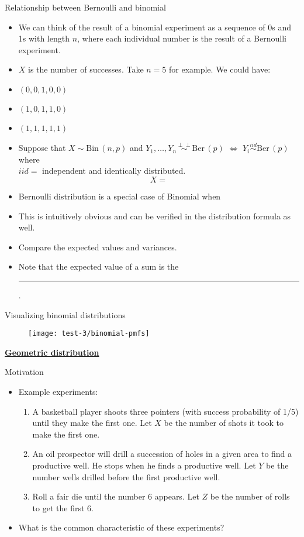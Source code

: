 \documentclass{article}
\newcommand{\bu}[1]{\textbf{\ul{#1}}}				%
\newcommand{\blankul}[1]{\rule[-1.5mm]{#1}{0.15mm}}	%
\newcommand{\vectwo}[2]{#1_1, \ldots, #1_{#2}}	%
\newcommand{\follow}[1]{\sim \text{#1}\,}		%
\newcommand{\followsp}[2]{\overset{#1}\sim \text{#2}\,}		%
\newcommand{\ind}{\perp \!\!\! \perp}		%
\begin{document}
Relationship between Bernoulli and binomial\bigskip
\begin{itemize}
    \item We can think of the result of a binomial experiment as a sequence of 0s and 1s with length $n$, where each individual number is the result of a Bernoulli experiment.
    \item $X$ is the number of successes. Take $n = 5$ for example. We could have:
    \item[] $(0,0,1,0,0)$
    \item[] $(1,0,1,1,0)$
    \item[] $(1,1,1,1,1)$\bigskip
    \item Suppose that $X \follow{Bin}(n, p)$ and $\vectwo{Y}{n} \followsp{\ind}{Ber}(p)$ $\Longleftrightarrow$ $Y_i \followsp{iid}{Ber}(p)$ where \\$iid = $ independent and identically distributed.
    \[X = \]
    \item[] Bernoulli distribution is a special case of Binomial when 
    \item[] This is intuitively obvious and can be verified in the distribution formula as well.
    \item Compare the expected values and variances.
    \item[] Note that the expected value of a sum is the \blankul{6cm}.\vspace{60pt}
\end{itemize}\bigskip

Visualizing binomial distributions\bigskip

\begin{figure}[H]
    \center\texttt{[image: test-3/binomial-pmfs]}
\end{figure}

\bu{Geometric distribution}\bigskip

Motivation\bigskip
\begin{itemize}
    \item Example experiments:
    \begin{enumerate}
        \item A basketball player shoots three pointers (with success probability of 1/5) until they make the first one. Let $X$ be the number of shots it took to make the first one.
        \item An oil prospector will drill a succession of holes in a given area to find a productive well. He stops when he finds a productive well. Let $Y$ be the number wells drilled before the first productive well.
        \item Roll a fair die until the number 6 appears. Let $Z$ be the number of rolls to get the first 6.
    \end{enumerate}
    \item What is the common characteristic of these experiments?
\end{itemize}\bigskip
\end{document}
